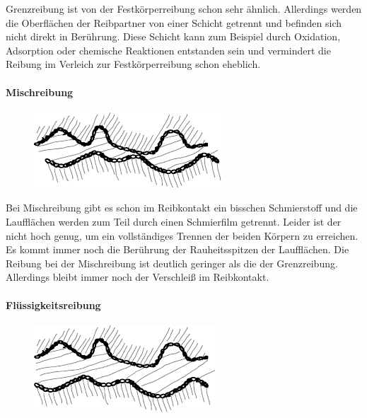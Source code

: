 Grenzreibung ist von der Festkörperreibung schon sehr ähnlich.
Allerdings werden die Oberflächen der Reibpartner von einer Schicht getrennt und befinden sich nicht direkt in Berührung.
Diese Schicht kann zum Beispiel durch Oxidation, Adsorption oder chemische Reaktionen entstanden sein und vermindert die Reibung im Verleich zur Festkörperreibung schon eheblich.

\paragraph{Mischreibung}
\label{par:mischreibung}
%
\begin{figure}
    \includegraphics[trim={0 0.5cm 0 0.5cm}]{./images/mischreibung.pdf}
\end{figure}

Bei Mischreibung gibt es schon im Reibkontakt ein bisschen Schmierstoff und die Laufflächen werden zum Teil durch einen Schmierfilm getrennt.
Leider ist der nicht hoch genug, um ein vollständiges Trennen der beiden Körpern zu erreichen.
Es kommt immer noch die Berührung der Rauheitsspitzen der Laufflächen.
Die Reibung bei der Mischreibung ist deutlich geringer als die der Grenzreibung. Allerdings bleibt immer noch der Verschleiß im Reibkontakt.

\paragraph{Flüssigkeitsreibung}
\label{par:fluessigkeitsreibung}
%
\begin{figure}
    \includegraphics[trim={0 0.5cm 0 0.5cm}]{./images/fluessigkeitreibung.pdf}
\end{figure}


